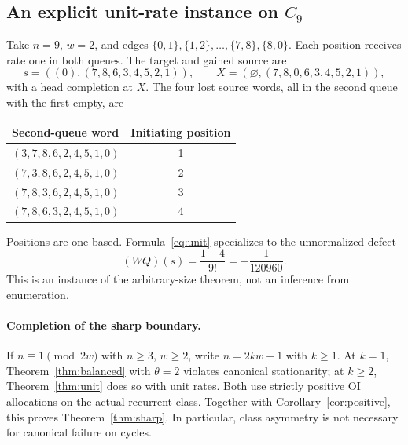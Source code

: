 \documentclass[11pt]{article}
\theoremstyle{remark}
\newcommand{\emptyq}{\varnothing}
\begin{document}
\subsection{An explicit unit-rate instance on \texorpdfstring{$C_9$}{C9}}\label{sec:nine}
Take $n=9$, $w=2$, and edges $\{0,1\},\{1,2\},\ldots,\{7,8\},\{8,0\}$. Each position receives rate one in both queues. The target and gained source are
\[
 s=((0),(7,8,6,3,4,5,2,1)),\qquad
 X=(\emptyq,(7,8,0,6,3,4,5,2,1)),
\]
with a head completion at $X$. The four lost source words, all in the second queue with the first empty, are
\begin{center}
\begin{tabular}{lc}
\toprule
Second-queue word & Initiating position\\
\midrule
$(3,7,8,6,2,4,5,1,0)$&1\\
$(7,3,8,6,2,4,5,1,0)$&2\\
$(7,8,3,6,2,4,5,1,0)$&3\\
$(7,8,6,3,2,4,5,1,0)$&4\\
\bottomrule
\end{tabular}
\end{center}
Positions are one-based. Formula~\eqref{eq:unit} specializes to the unnormalized defect
\begin{equation}\label{eq:nine}
 (WQ)(s)=\frac{1-4}{9!}=-\frac1{120960}.
\end{equation}
This is an instance of the arbitrary-size theorem, not an inference from enumeration.

\paragraph{Completion of the sharp boundary.}
If $n\equiv1\pmod{2w}$ with $n\ge3$, $w\ge2$, write $n=2kw+1$ with $k\ge1$. At $k=1$, Theorem~\ref{thm:balanced} with $\theta=2$ violates canonical stationarity; at $k\ge2$, Theorem~\ref{thm:unit} does so with unit rates. Both use strictly positive OI allocations on the actual recurrent class. Together with Corollary~\ref{cor:positive}, this proves Theorem~\ref{thm:sharp}. In particular, class asymmetry is not necessary for canonical failure on cycles.
\end{document}
